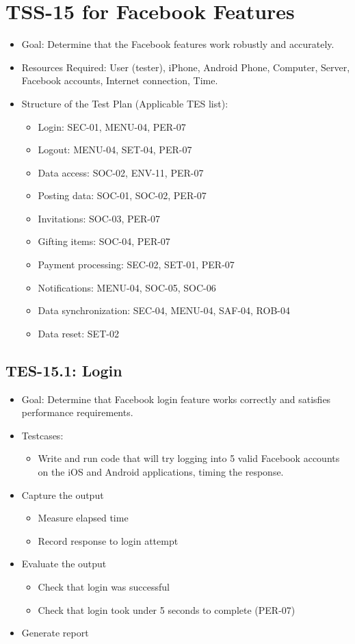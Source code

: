 \section{TSS-15 for Facebook Features}
\begin{itemize}
\item Goal: Determine that the Facebook features work robustly and accurately.
\item Resources Required: User (tester), iPhone, Android Phone, Computer, 
Server, Facebook accounts, Internet connection, Time. 
\item Structure of the Test Plan (Applicable TES list): 

\begin{itemize}
\item Login: SEC-01, MENU-04, PER-07
\item Logout: MENU-04, SET-04, PER-07
\item Data access: SOC-02, ENV-11, PER-07
\item Posting data: SOC-01, SOC-02, PER-07
\item Invitations: SOC-03, PER-07
\item Gifting items: SOC-04, PER-07
\item Payment processing: SEC-02, SET-01, PER-07
\item Notifications: MENU-04, SOC-05, SOC-06
\item Data synchronization: SEC-04, MENU-04, SAF-04, ROB-04
\item Data reset: SET-02
\end{itemize}
\end{itemize}

\subsection{TES-15.1: Login}
\begin{itemize}
\item Goal: Determine that Facebook login feature works correctly and 
satisfies performance requirements.
\item Testcases: 
\begin{itemize}
\item Write and run code that will try logging into 5 valid Facebook accounts 
on the iOS and Android applications, timing the response.
\end{itemize}
\item Capture the output 
\begin{itemize}
\item Measure elapsed time 
\item Record response to login attempt
\end{itemize}
\item Evaluate the output
\begin{itemize}
\item Check that login was successful
\item Check that login took under 5 seconds to complete (PER-07)
\end{itemize}
\item Generate report 
\end{itemize}

